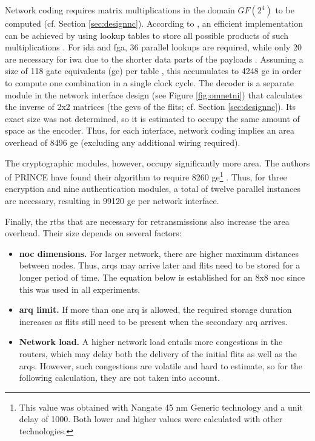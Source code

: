 Network coding requires matrix multiplications in the domain $GF(2^4)$ to be computed (cf. Section \ref{sec:designnc}). According to
\citeauthor{moriam18activeattackers}, an efficient implementation can be achieved by using lookup tables to store all possible products of such
multiplications \cite[6]{moriam18activeattackers}. For \gls{ida} and \gls{fga}, 36 parallel lookups are required, while only 20 are necessary for
\gls{iwa} due to the shorter data parts of the payloads \cite[6]{moriam18activeattackers}. Assuming a size of 118 gate equivalents (\gls{ge}) per
table \cite[6]{moriam18activeattackers}, this accumulates to 4248 \gls{ge} in order to compute one combination in a single clock cycle. The decoder
is a separate module in the network interface design (see Figure \ref{fig:omnetni}) that calculates the inverse of 2x2 matrices (the \glspl{gev} of
the flits; cf. Section \ref{sec:designnc}). Its exact size was not determined, so it is estimated to occupy the same amount of space as the encoder.
Thus, for each interface, network coding implies an area overhead of 8496 \gls{ge} (excluding any additional wiring required).

The cryptographic modules, however, occupy significantly more area. The authors of PRINCE have found their algorithm to require 8260
\gls{ge}\footnote{This value was obtained with Nangate 45 nm Generic technology and a unit delay of 1000. Both lower and higher values were calculated
with other technologies.} \cite[16]{borghoff12prince}. Thus, for three encryption and nine authentication modules, a total of twelve parallel
instances are necessary, resulting in \num{99120} \gls{ge} per network interface.

Finally, the \glspl{rtb} that are necessary for retransmissions also increase the area overhead. Their size depends on several factors:
\begin{itemize}
    \item \textbf{\Gls{noc} dimensions.} For larger network, there are higher maximum distances between nodes. Thus, \glspl{arq} may arrive later and
        flits need to be stored for a longer period of time. The equation below is established for an 8x8 \gls{noc} since this was used in all
        experiments.
    \item \textbf{\Gls{arq} limit.} If more than one \gls{arq} is allowed, the required storage duration increases as flits still need to be present
        when the secondary \gls{arq} arrives.
    \item \textbf{Network load.} A higher network load entails more congestions in the routers, which may delay both the delivery of the initial flits
        as well as the \glspl{arq}. However, such congestions are volatile and hard to estimate, so for the following calculation, they are not taken
        into account.
\end{itemize}

